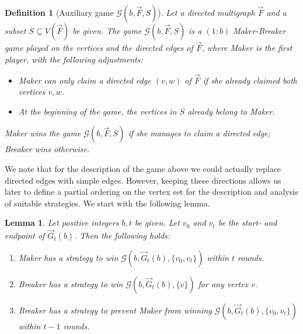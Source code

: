 \documentclass[reqno, 12pt]{amsart}
\numberwithin{equation}{section}
\numberwithin{figure}{section}
\newtheorem{lemma}[theorem]{Lemma}
\newtheorem{definition}[theorem]{Definition}
\begin{document}
\begin{definition}[Auxiliary game $\mathcal{G}(b,\vec{F},S)$]
\label{def:auxiliary.directed.game}
Let a directed multigraph $\vec{F}$ and a subset
$S \subseteq V(\vec{F})$ be given.
The game $\mathcal{G}(b,\vec{F},S)$ is a $(1:b)$ Maker-Breaker game  played on the vertices and the directed edges of $\vec{F}$,
where Maker is the first player, with the following adjustments:
\begin{itemize}
\item[(a)] Maker can only claim a directed edge 
$(v,w)$ of $\vec{F}$ if she already claimed both vertices $v,w$.
\item[(b)] At the beginning of the game, the vertices in $S$ already belong to Maker.
\end{itemize}
Maker wins the game $\mathcal{G}(b,\vec{F},S)$ if she manages to claim a directed edge; Breaker wins otherwise.
\end{definition}


We note that for the description of the game above we could actually replace
directed edges with simple edges. However, keeping these directions allows us later to define a partial ordering on the vertex set for the description and analysis of suitable strategies.
We start with the following lemma.


\begin{lemma} \label{lem:game.directed.G}
Let positive integers $b,t$ be given.
Let $v_0$ and $v_t$ be the start- and endpoint of $\vec{G}_t(b)$. 
Then the following holds:
\begin{enumerate}
\item Maker has a strategy to win
$\mathcal{G}(b,\vec{G}_t(b),\{v_0,v_t\})$ within $t$ rounds.
\item Breaker has a strategy to win
$\mathcal{G}(b,\vec{G}_t(b),\{v\})$ for any vertex $v$.
\item Breaker has a strategy to prevent Maker from winning
$\mathcal{G}(b,\vec{G}_t(b),\{v_0,v_t\})$ within $t-1$ rounds.
\end{enumerate}
\end{lemma}
\end{document}
